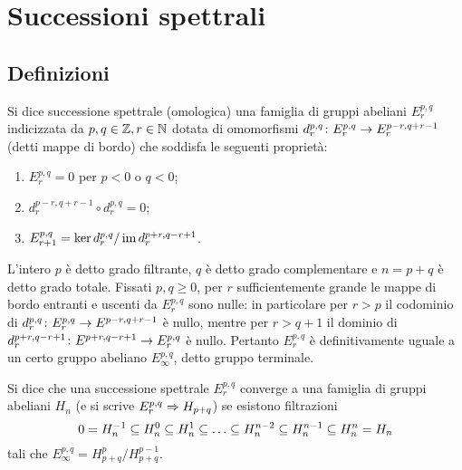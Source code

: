 \chapter{Successioni spettrali}
\section{Definizioni}
\begin{definition}
Si dice successione spettrale (omologica) una famiglia di gruppi abeliani $E^{p,q}_r$ indicizzata da $p,q\in\mathbb{Z},r\in\mathbb{N}$ dotata di omomorfismi $d^{p,q}_r\colon E^{p,q}_r\to E^{p-r,q+r-1}_r$ (detti mappe di bordo) che soddisfa le seguenti proprietà:
\begin{enumerate}
\item $E^{p,q}_r=0$ per $p<0$ o $q<0$;
\item $d^{p-r,q+r-1}_r\circ d^{p,q}_r=0$;
\item $E^{p,q}_{r+1}=\ker d^{p,q}_r/\operatorname{im} d^{p+r,q-r+1}_r$.
\end{enumerate}
\end{definition}
L'intero $p$ è detto grado filtrante, $q$ è detto grado complementare e $n=p+q$ è detto grado totale. Fissati $p,q\ge 0$, per $r$ sufficientemente grande le mappe di bordo entranti e uscenti da $E^{p,q}_r$ sono nulle: in particolare per $r>p$ il codominio di $d^{p,q}_r\colon E^{p,q}_r\to E^{p-r,q+r-1}$ è nullo, mentre per $r>q+1$ il dominio di $d^{p+r,q-r+1}_r\colon E^{p+r,q-r+1}\to E^{p,q}_r$ è nullo. Pertanto $E^{p,q}_r$ è definitivamente uguale a un certo gruppo abeliano $E^{p,q}_\infty$, detto gruppo terminale.
\begin{definition}
Si dice che una successione spettrale $E^{p,q}_r$ converge a una famiglia di gruppi abeliani $H_n$ (e si scrive $E^{p,q}_r\Rightarrow H_{p+q}$) se esistono filtrazioni
$$
0=H^{-1}_n\subseteq H^0_n\subseteq H^1_n\subseteq\ldots\subseteq H^{n-2}_n\subseteq H^{n-1}_n\subseteq H^n_n=H_n
$$
tali che $E^{p,q}_\infty=H^p_{p+q}/H^{p-1}_{p+q}$.
\end{definition}

